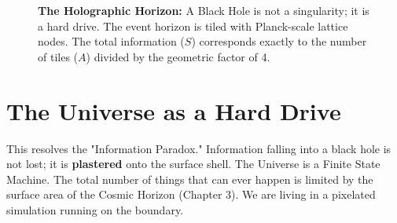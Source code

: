 \documentclass[11pt, letterpaper, openany]{book}
\begin{document}
\begin{figure}[h]
\centering
{}
\caption{\textbf{The Holographic Horizon:} A Black Hole is not a singularity; it is a hard drive. The event horizon is tiled with Planck-scale lattice nodes. The total information ($S$) corresponds exactly to the number of tiles ($A$) divided by the geometric factor of 4.}
\label{fig:holographic_horizon}
\end{figure}

\section{The Universe as a Hard Drive}
This resolves the "Information Paradox." Information falling into a black hole is not lost; it is \textbf{plastered} onto the surface shell.
The Universe is a Finite State Machine. The total number of things that can ever happen is limited by the surface area of the Cosmic Horizon (Chapter 3). We are living in a pixelated simulation running on the boundary.
\end{document}
